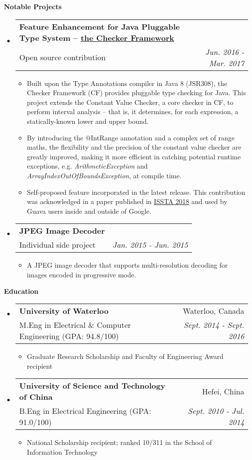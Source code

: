 \documentclass[letterpaper,10pt]{article}
\makeatletter
\newcommand{\resitem}[1]{\item #1 \vspace{-2pt}}
\newcommand{\resheading}[1]{{\large \colorbox{mygrey}{\begin{minipage}{\textwidth}{\textbf{#1 \vphantom{p\^{E}}}}\end{minipage}}}}
\newcommand{\ressubheading}[4]{
\begin{tabular*}{7.0in}{l@{\extracolsep{\fill}}r}
    \textbf{#1} & #2 \\
    #3 & \textit{#4} \\
\end{tabular*}\vspace{-6pt}}
\makeatother
\begin{document}
\resheading{Notable Projects}
\begin{itemize}
\itemsep0em
\item
	\ressubheading{Feature Enhancement for Java Pluggable Type System -- \href{https://github.com/typetools/checker-framework}{the Checker Framework}}{}{Open source contribution}{Jun. 2016 - Mar. 2017}
	\begin{itemize}
        \resitem{Built upon the Type Annotations compiler in Java 8 (JSR308), the Checker Framework (CF) provides pluggable type checking for Java. This project extends the Constant Value Checker, a core checker in CF, to perform interval analysis -- that is, it determines, for each expression, a statically-known lower and upper bound.}
        \resitem{By introducing the @IntRange annotation and a complex set of range maths, the flexibility and the precision of the constant value checker are greatly improved, making it more efficient in catching potential runtime exceptions, e.g. \textit{ArithmeticException} and \textit{ArrayIndexOutOfBoundsException}, at compile time.}
        \resitem{Self-proposed feature incorporated in the latest release. This contribution was acknowledged in a paper published in \href{https://homes.cs.washington.edu/~mernst/pubs/array-indexing-issta2018.pdf}{ISSTA 2018} and used by Guava users inside and outside of Google.}
	\end{itemize}
\item
	\ressubheading{JPEG Image Decoder}{}{Individual side project}{Jan. 2015 - Jun. 2015}
	\begin{itemize}
		\resitem{A JPEG image decoder that supports multi-resolution decoding for images encoded in progressive mode.}
	\end{itemize}
	
\end{itemize}

\resheading{Education}
\begin{itemize}
\itemsep0em
\item
	\ressubheading{University of Waterloo}{Waterloo, Canada}{M.Eng in Electrical \& Computer Engineering (GPA: 94.8/100)}{Sept. 2014 - Sept. 2016}
	\begin{itemize}
        \resitem{Graduate Research Scholarship and Faculty of Engineering Award recipient}
	\end{itemize}
\item
	\ressubheading{University of Science and Technology of China}{Hefei, China}{B.Eng in Electrical Engineering (GPA: 91.0/100)}{Sept. 2010 - Jul. 2014}
	\begin{itemize}
        \resitem{ National Scholarship recipient; ranked 10/311 in the School of Information Technology}
	\end{itemize}

\end{itemize}
\end{document}
